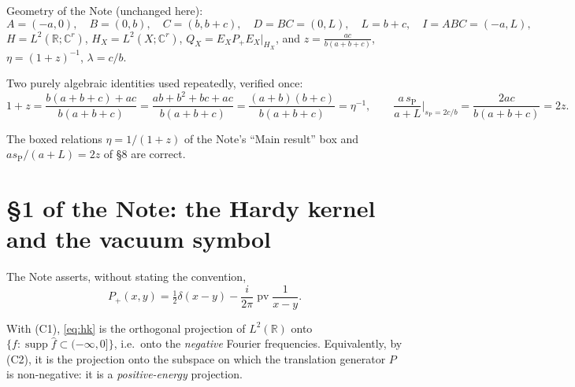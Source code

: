 \documentclass[11pt]{article}
\newcommand{\supp}{\operatorname{supp}}
\newcommand{\pv}{\operatorname{pv}}
\begin{document}
Geometry of the Note (unchanged here):
\[
 A=(-a,0),\quad B=(0,b),\quad C=(b,b+c),\quad D=BC=(0,L),\quad L=b+c,\quad
 I=ABC=(-a,L),
\]
$H=L^2(\mathbb R;\mathbb C^r)$, $H_X=L^2(X;\mathbb C^r)$,
$Q_X=E_XP_+E_X|_{H_X}$, and
$z=\frac{ac}{b(a+b+c)}$, $\eta=(1+z)^{-1}$, $\lambda=c/b$.

\medskip
Two purely algebraic identities used repeatedly, verified once:
\[
 1+z=\frac{b(a+b+c)+ac}{b(a+b+c)}=\frac{ab+b^2+bc+ac}{b(a+b+c)}
 =\frac{(a+b)(b+c)}{b(a+b+c)}=\eta^{-1},
 \qquad
 \frac{a\,s_{\mathrm P}}{a+L}\Big|_{s_{\mathrm P}=2c/b}=\frac{2ac}{b(a+b+c)}=2z .
\]
\begin{verdictok}
The boxed relations $\eta=1/(1+z)$ of the Note's ``Main result'' box and
$as_{\mathrm P}/(a+L)=2z$ of \S8 are correct.
\end{verdictok}

\section{\S1 of the Note: the Hardy kernel and the vacuum symbol}\label{sec:one}

The Note asserts, without stating the convention,
\begin{equation}\label{eq:hk}\tag{hardy-kernel}
 P_+(x,y)=\tfrac12\delta(x-y)-\frac i{2\pi}\pv\frac1{x-y}.
\end{equation}

\begin{lemma}\label{lem:freq}
With (C1), \eqref{eq:hk} is the orthogonal projection of $L^2(\mathbb R)$ onto
$\{f:\supp\widehat f\subset(-\infty,0]\}$, i.e.\ onto the \emph{negative}
Fourier frequencies. Equivalently, by (C2), it is the projection onto the
subspace on which the translation generator $P$ is non-negative: it is a
\emph{positive-energy} projection.
\end{lemma}
\end{document}
